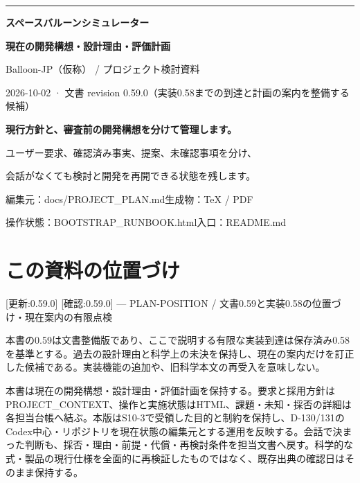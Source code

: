 \documentclass[11pt,a4paper]{article}
\begin{document}
\begin{titlepage}
\vspace*{22mm}
{\color{accent}\rule{\linewidth}{1.2pt}}\par\vspace{12mm}
{\fontsize{27}{38}\selectfont\bfseries\color{ink}スペースバルーンシミュレーター\par}
\vspace{8mm}
{\LARGE\bfseries 現在の開発構想・設計理由・評価計画\par}
\vspace{17mm}
{\large Balloon-JP（仮称） / プロジェクト検討資料\par}
\vspace{4mm}
{\large 2026-10-02 · 文書 revision
0.59.0（実装0.58までの到達と計画の案内を整備する候補）\par}
\vfill
{\large\bfseries 現行方針と、審査前の開発構想を分けて管理します。}\par
\vspace{3mm}
ユーザー要求、確認済み事実、提案、未確認事項を分け、\par
会話がなくても検討と開発を再開できる状態を残します。\par
\vspace{7mm}
{\small 編集元：docs/PROJECT\_PLAN.md\quad 生成物：TeX / PDF}\par
{\small 操作状態：BOOTSTRAP\_RUNBOOK.html\quad 入口：README.md}\par
\end{titlepage}
\tableofcontents
\clearpage
\section{この資料の位置づけ}\label{ux3053ux306eux8cc7ux6599ux306eux4f4dux7f6eux3065ux3051}

{[}更新:0.59.0{]} {[}確認:0.59.0{]} --- PLAN-POSITION /
文書0.59と実装0.58の位置づけ・現在案内の有限点検

本書の0.59は文書整備版であり、ここで説明する有限な実装到達は保存済み0.58を基準とする。過去の設計理由と科学上の未決を保持し、現在の案内だけを訂正した候補である。実装機能の追加や、旧科学本文の再受入を意味しない。

本書は現在の開発構想・設計理由・評価計画を保持する。要求と採用方針はPROJECT\_CONTEXT、操作と実施状態はHTML、課題・未知・採否の詳細は各担当台帳へ結ぶ。本版はS10-3で受領した目的と制約を保持し、D-130/131のCodex中心・リポジトリを現在状態の編集元とする運用を反映する。会話で決まった判断も、採否・理由・前提・代償・再検討条件を担当文書へ戻す。科学的な式・製品の現行仕様を全面的に再検証したものではなく、既存出典の確認日はそのまま保持する。
\end{document}
